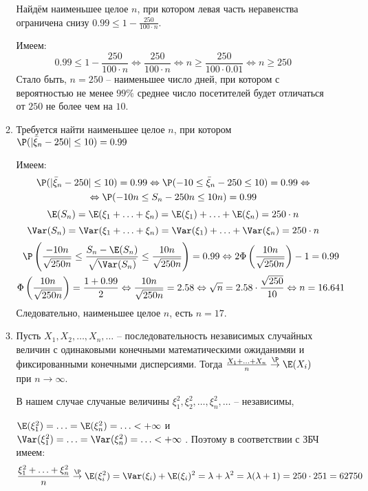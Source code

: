 \begin{enumerate}
\begin{enumerate}
Найдём наименьшее целое $n$, при котором левая часть неравенства ограничена снизу $0.99 \leq 1 - \frac{250}{100\cdot n}$.

Имеем:
\[
0.99 \leq 1 - \frac{250}{100\cdot n} \Leftrightarrow \frac{250}{100\cdot n} \Leftrightarrow n \geq \frac{250}{100 \cdot 0.01} \Leftrightarrow n  \geq 250
\]
Стало быть, $n=250$ – наименьшее число дней, при котором с вероятностью не менее $99\%$ среднее число посетителей будет отличаться от $250$ не более чем на $10$.
\item  Требуется найти наименьшее целое $n$, при котором $\P(\vert\bar{\xi}_n-250\vert \leq 10)=0.99$

Имеем:
\begin{multline*}
\P(\vert\bar{\xi}_n-250\vert \leq 10)=0.99 \Leftrightarrow \P(-10\leq \bar{\xi}_n -250 \leq 10) =0.99 \Leftrightarrow \\
\Leftrightarrow  \P(-10n \leq S_n-250n \leq 10n) =0.99
\end{multline*}
\[
\E(S_n) = \E(\xi_1 + \ldots + \xi_n) = \E(\xi_1) + \ldots + \E(\xi_n) = 250\cdot n
\]
\[
\Var(S_n) = \Var(\xi_1 + \ldots + \xi_n) = \Var(\xi_1) + \ldots + \Var(\xi_n) = 250 \cdot n
\]
\begin{multline*}
\P\left(\frac{-10n}{\sqrt{250n}} \leq \frac{S_n - \E (S_n)}{\sqrt{\Var(S_n)}} \leq \frac{10n}{\sqrt{250n}}\right) =0.99 \Leftrightarrow 2 \Phi \left(\frac{10n}{\sqrt{250n}}\right) -1 = 0.99 \\
\Phi \left(\frac{10n}{\sqrt{250n}}\right) = \frac{1 + 0.99}{2} \Leftrightarrow \frac{10n}{\sqrt{250n}} = 2.58 \Leftrightarrow \sqrt{n} = 2.58 \cdot \frac{\sqrt{250}}{10} \Leftrightarrow n = 16.641
\end{multline*}
Следовательно, наименьшее целое $n$, есть $n=17$.
\item Пусть $X_1, X_2, \ldots, X_n, \ldots$ – последовательность независимых случайных величин с одинаковыми конечными математическими ожиданимяи и фиксированными конечными дисперсиями. Тогда $\frac{X_1 + \ldots + X_n}{n} \stackrel{\P}{\to} \E(X_i)$ при $n \to \infty$.

В нашем случае случаные величины $\xi_1^2, \xi_2^2, \ldots, \xi_n^2, \ldots$ – независимы,

$\E(\xi_1^2) = \ldots = \E(\xi_n^2) = \ldots < + \infty$ и $\Var(\xi_1^2) = \ldots = \Var(\xi_n^2) = \ldots < + \infty$ . Поэтому в соответствии с ЗБЧ имеем:
\[
\frac{\xi_1^2 +\ldots+ \xi_n^2}{n} \stackrel{\P}{\to} \E(\xi_i^2) = \Var(\xi_i) +\E(\xi_i)^2 = \lambda + \lambda^2 = \lambda(\lambda+1) = 250\cdot251 = 62750
\]
\end{enumerate}


\end{enumerate}
